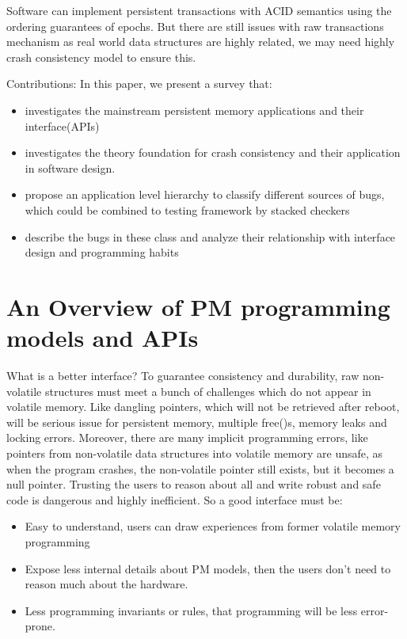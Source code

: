 \documentclass{sig-alternate}
\begin{document}
Software can implement persistent transactions with ACID semantics using the ordering guarantees of epochs. But there are still issues with raw transactions mechanism as real world data structures are highly related, we may need highly crash consistency model to ensure this.

\vspace{1ex}Contributions: In this paper, we present a survey that:

\begin{itemize}
\item investigates the mainstream persistent memory applications and their interface(APIs)
\item investigates the theory foundation for crash consistency and their application in software design.
\item propose an application level hierarchy to classify different sources of bugs, which could be combined to testing framework by stacked checkers
\item describe the bugs in these class and analyze their relationship with interface design and programming habits

\end{itemize}

\section{An Overview of PM programming models and APIs}

What is a better interface? To guarantee consistency and durability, raw non-volatile structures must meet a bunch of challenges which do not appear in volatile memory. Like dangling pointers, which will not be retrieved after reboot, will be serious issue for persistent memory, multiple free()s, memory leaks and locking errors. Moreover, there are many implicit programming errors, like pointers from non-volatile data structures into volatile memory are unsafe, as when the program crashes, the non-volatile pointer still exists, but it becomes a null pointer. Trusting the users to reason about all and write robust and safe code is dangerous and highly inefficient. So a good interface must be: 



\begin{itemize}
\item Easy to understand, users can draw experiences from former volatile memory programming
\item Expose less internal details about PM models, then the users don’t need to reason much about the hardware.
\item Less programming invariants or rules, that programming will be less error-prone.
\end{itemize}
\end{document}
